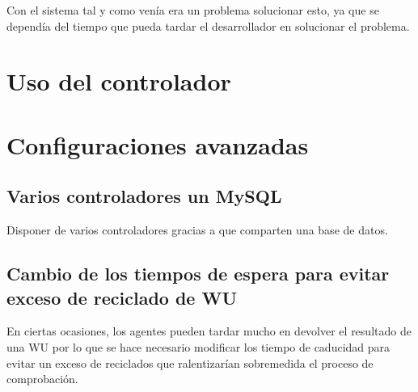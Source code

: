 Con el sistema tal y como venía era un problema solucionar esto, ya que se dependía del tiempo que pueda tardar el desarrollador en solucionar el problema.

\section{Uso del controlador}

\section{Configuraciones avanzadas}\label{sec:conf_avanzada}

\subsection{Varios controladores un MySQL}
Disponer de varios controladores gracias a que comparten una base de datos.

\subsection{Cambio de los tiempos de espera para evitar exceso de reciclado de WU}
En ciertas ocasiones, los agentes pueden tardar mucho en devolver el resultado de una WU por lo que se hace necesario modificar los tiempo de caducidad para evitar un exceso de reciclados que ralentizarían sobremedida el proceso de comprobación.